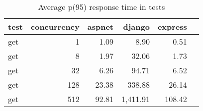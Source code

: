 \FloatBarrier
\begin{table}[!htp]\centering
    \caption{Average p(95) response time in tests}\label{tab:resultsGet}
    \scriptsize
    \begin{tabular}{lrrrrr}\toprule
        test & concurrency & aspnet & django   & express \\\midrule
        get  & 1           & 1.09   & 8.90     & 0.51    \\
        get  & 8           & 1.97   & 32.06    & 1.73    \\
        get  & 32          & 6.26   & 94.71    & 6.52    \\
        get  & 128         & 23.38  & 338.88   & 26.14   \\
        get  & 512         & 92.81  & 1,411.91 & 108.42  \\
        \bottomrule
    \end{tabular}
\end{table}
\FloatBarrier
